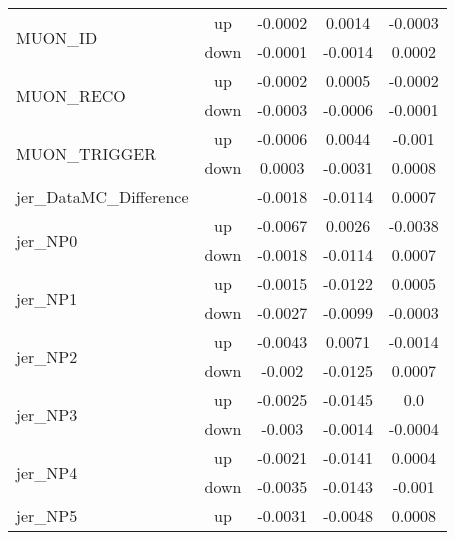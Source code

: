 \begin{table}[h!]
\begin{tabular}{lcccc}
\multirow{2}{*}{MUON\_ID}      & up   &     -0.0002     &     0.0014     &     -0.0003      \\
                                       & down &     -0.0001     &     -0.0014     &     0.0002       \\ \hline
\multirow{2}{*}{MUON\_RECO}      & up   &     -0.0002     &     0.0005     &     -0.0002      \\
                                       & down &     -0.0003     &     -0.0006     &     -0.0001       \\ \hline
\multirow{2}{*}{MUON\_TRIGGER}      & up   &     -0.0006     &     0.0044     &     -0.001      \\
                                       & down &     0.0003     &     -0.0031     &     0.0008       \\ \hline
\multirow{2}{*}{jer\_DataMC\_Difference}  &  & \multirow{2}{*}{-0.0018} & \multirow{2}{*}{-0.0114}  & \multirow{2}{*}{0.0007}  \\  \\ \hline
\multirow{2}{*}{jer\_NP0}      & up   &     -0.0067     &     0.0026     &     -0.0038      \\
                                       & down &     -0.0018     &     -0.0114     &     0.0007       \\ \hline
\multirow{2}{*}{jer\_NP1}      & up   &     -0.0015     &     -0.0122     &     0.0005      \\
                                       & down &     -0.0027     &     -0.0099     &     -0.0003       \\ \hline
\multirow{2}{*}{jer\_NP2}      & up   &     -0.0043     &     0.0071     &     -0.0014      \\
                                       & down &     -0.002     &     -0.0125     &     0.0007       \\ \hline
\multirow{2}{*}{jer\_NP3}      & up   &     -0.0025     &     -0.0145     &     0.0      \\
                                       & down &     -0.003     &     -0.0014     &     -0.0004       \\ \hline
\multirow{2}{*}{jer\_NP4}      & up   &     -0.0021     &     -0.0141     &     0.0004      \\
                                       & down &     -0.0035     &     -0.0143     &     -0.001       \\ \hline
\multirow{2}{*}{jer\_NP5}      & up   &     -0.0031     &     -0.0048     &     0.0008      \\

\end{tabular}
\end{table}
